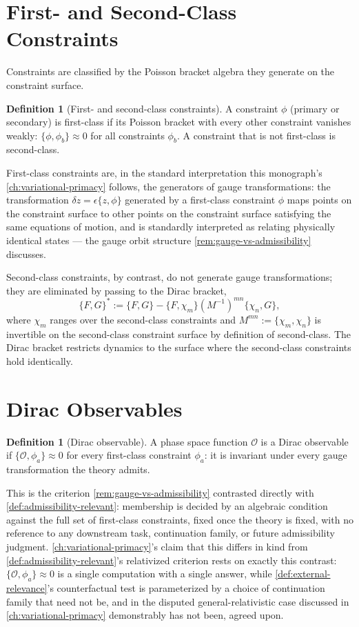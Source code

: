 \documentclass[11pt]{book}
\theoremstyle{plain}
\theoremstyle{definition}
\newtheorem{definition}[theorem]{Definition}
\theoremstyle{remark}
\begin{document}
\section{First- and Second-Class Constraints}

Constraints are classified by the Poisson bracket algebra they
generate on the constraint surface.

\begin{definition}[First- and second-class constraints]
A constraint $\phi$ (primary or secondary) is first-class if its
Poisson bracket with every other constraint vanishes weakly:
$\{\phi, \phi_b\} \approx 0$ for all constraints $\phi_b$. A
constraint that is not first-class is second-class.
\end{definition}

First-class constraints are, in the standard interpretation this
monograph's \cref{ch:variational-primacy} follows, the generators of
gauge transformations: the transformation $\delta z = \epsilon
\{z,\phi\}$ generated by a first-class constraint $\phi$ maps points
on the constraint surface to other points on the constraint surface
satisfying the same equations of motion, and is standardly interpreted
as relating physically identical states --- the gauge orbit structure
\cref{rem:gauge-vs-admissibility} discusses.

Second-class constraints, by contrast, do not generate gauge
transformations; they are eliminated by passing to the Dirac bracket,
\[
\{F,G\}^* := \{F,G\} - \{F,\chi_m\}(M^{-1})^{mn}\{\chi_n,G\},
\]
where $\chi_m$ ranges over the second-class constraints and $M^{mn} :=
\{\chi_m,\chi_n\}$ is invertible on the second-class constraint
surface by definition of second-class. The Dirac bracket restricts
dynamics to the surface where the second-class constraints hold
identically.

\section{Dirac Observables}

\begin{definition}[Dirac observable]
A phase space function $\mathcal{O}$ is a Dirac observable if
$\{\mathcal{O}, \phi_a\} \approx 0$ for every first-class constraint
$\phi_a$: it is invariant under every gauge transformation the theory
admits.
\end{definition}

This is the criterion \cref{rem:gauge-vs-admissibility} contrasted
directly with \cref{def:admissibility-relevant}: membership is decided
by an algebraic condition against the full set of first-class
constraints, fixed once the theory is fixed, with no reference to any
downstream task, continuation family, or future admissibility
judgment. \cref{ch:variational-primacy}'s claim that this differs in
kind from \cref{def:admissibility-relevant}'s relativized criterion
rests on exactly this contrast: $\{\mathcal{O},\phi_a\}\approx 0$ is a
single computation with a single answer, while
\cref{def:external-relevance}'s counterfactual test is parameterized
by a choice of continuation family that need not be, and in the
disputed general-relativistic case discussed in
\cref{ch:variational-primacy} demonstrably has not been, agreed upon.
\end{document}
